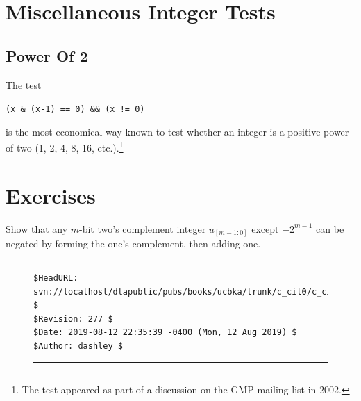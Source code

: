 \section{Miscellaneous Integer Tests}
\label{ccil0:smit0}

\subsection{Power Of 2}
\label{ccil0:smit0:sptw0}


The test

\texttt{(x \& (x-1) == 0) \&\& (x != 0)}

\noindent{}is the most economical way known to 
test whether an integer is a positive power of two 
(1, 2, 4, 8, 16, etc.).\footnote{The test appeared as part of
a discussion on 
the GMP mailing list in 2002.}


\section{Exercises}

\begin{vworkexercisestatement}
\label{exe:ccil0:sexe0:01}
Show that any $m$-bit two's complement integer $u_{[m-1:0]}$ except
$-2^{m-1}$ can be negated by forming the one's complement, then adding one.
\end{vworkexercisestatement}



\vfill
\noindent\begin{figure}[!b]
\noindent\rule[-0.25in]{\textwidth}{1pt}
\begin{tiny}
\begin{verbatim}
$HeadURL: svn://localhost/dtapublic/pubs/books/ucbka/trunk/c_cil0/c_cil0.tex $
$Revision: 277 $
$Date: 2019-08-12 22:35:39 -0400 (Mon, 12 Aug 2019) $
$Author: dashley $
\end{verbatim}
\end{tiny}
\noindent\rule[0.25in]{\textwidth}{1pt}
\end{figure}

%
